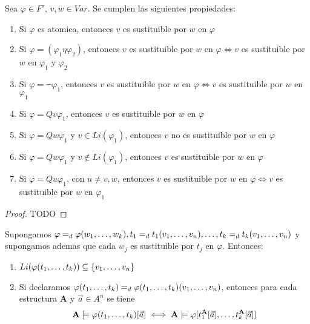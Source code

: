 \begin{lemma}
  Sea $\varphi \in F^\tau$, $v, w \in Var$. Se cumplen las siguientes propiedades: \begin{enumerate}
    \item Si $\varphi$ es atomica, entonces $v$ es sustituible por $w$ en $\varphi$
    \item Si $\varphi = (\varphi_1\eta\varphi_2)$, entonces $v$ es sustituible por $w$ en $\varphi \iff v$ es sustituible por $w$ en $\varphi_1$ y $\varphi_2$
    \item Si $\varphi = \neg\varphi_1$, entonces $v$ es sustituible por $w$ en $\varphi \iff v$ es sustituible por $w$ en $\varphi_1$
    \item Si $\varphi = Qv\varphi_1$, entonces $v$ es sustituible por $w$ en $\varphi$
    \item Si $\varphi = Qw\varphi_1$ y $v \in Li(\varphi_1)$, entonces $v$ no es sustituible por $w$ en $\varphi$
    \item Si $\varphi = Qw\varphi_1$ y $v \not\in Li(\varphi_1)$, entonces $v$ es sustituible por $w$ en $\varphi$
    \item Si $\varphi = Qu\varphi_1$, con $u \neq v, w$, entonces $v$ es sustituible por $w$ en $\varphi \iff v$ es sustituible por $w$ en $\varphi_1$
  \end{enumerate}
\end{lemma}

\begin{proof}
  TODO
\end{proof}

\begin{theorem}
  Supongamos $\varphi =_d \varphi(w_{1}, \dots, w_{k}), t_1 =_d t_1(v_{1}, \dots, v_{n}), \dots, t_k =_d t_k(v_{1}, \dots, v_{n})$
  y supongamos ademas que cada $w_j$ es sustituible por $t_j$ en $\varphi$. Entonces: \begin{enumerate}
    \item $Li(\varphi(t_{1}, \dots, t_{k})) \subseteq \{v_{1}, \dots, v_{n}\}$
    \item Si declaramos $\varphi(t_{1}, \dots, t_{k}) =_d \varphi(t_{1}, \dots, t_{k})(v_{1}, \dots, v_{n})$, entonces para cada estructura $\mathbf{A}$ y $\vec{a} \in A^n$ se tiene
    $$
    \mathbf{A}\models\varphi(t_{1}, \dots, t_{k})[\vec{a}] \iff \mathbf{A}\models\varphi[t_1^\mathbf{A}[\vec{a}], \dots, t_k^\mathbf{A}[\vec{a}]]
    $$
  \end{enumerate}
\end{theorem}

